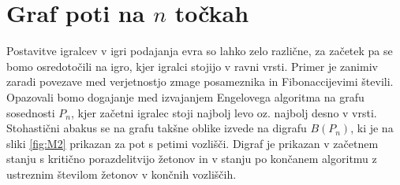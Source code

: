\documentclass[twoside,11pt]{article}
\begin{document}
\section{Graf poti na $n$ točkah}

Postavitve igralcev v igri podajanja evra so lahko zelo različne, za začetek pa se bomo osredotočili na igro, kjer igralci stojijo v ravni vrsti. Primer je zanimiv zaradi povezave med verjetnostjo zmage posameznika in Fibonaccijevimi števili. 
Opazovali bomo dogajanje med izvajanjem Engelovega algoritma na grafu sosednosti $P_n$, kjer začetni igralec stoji najbolj levo oz. najbolj desno v vrsti. Stohastični abakus se na
grafu takšne oblike izvede na digrafu $B(P_{n})$, ki je na sliki \ref{fig:M2} prikazan za pot s petimi vozlišči. Digraf je prikazan v začetnem stanju s kritično porazdelitvijo žetonov in v stanju po končanem algoritmu z ustreznim številom žetonov v končnih vozliščih.
\end{document}
